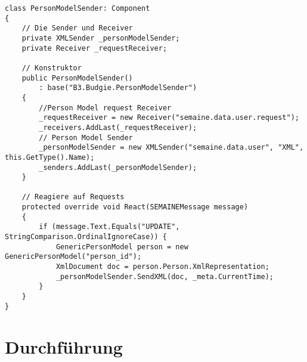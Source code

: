 \begin{lstlisting}
class PersonModelSender: Component
{
    // Die Sender und Receiver
    private XMLSender _personModelSender;
    private Receiver _requestReceiver;

    // Konstruktor
    public PersonModelSender()
        : base("B3.Budgie.PersonModelSender")
    {
        //Person Model request Receiver
        _requestReceiver = new Receiver("semaine.data.user.request");
        _receivers.AddLast(_requestReceiver);
        // Person Model Sender
        _personModelSender = new XMLSender("semaine.data.user", "XML", this.GetType().Name);
        _senders.AddLast(_personModelSender);
    }

    // Reagiere auf Requests
    protected override void React(SEMAINEMessage message)
    {
        if (message.Text.Equals("UPDATE", StringComparison.OrdinalIgnoreCase)) {
            GenericPersonModel person = new GenericPersonModel("person_id");
            XmlDocument doc = person.Person.XmlRepresentation;
            _personModelSender.SendXML(doc, _meta.CurrentTime);
        }
    } 
}
\end{lstlisting}






\section{Durchführung}



